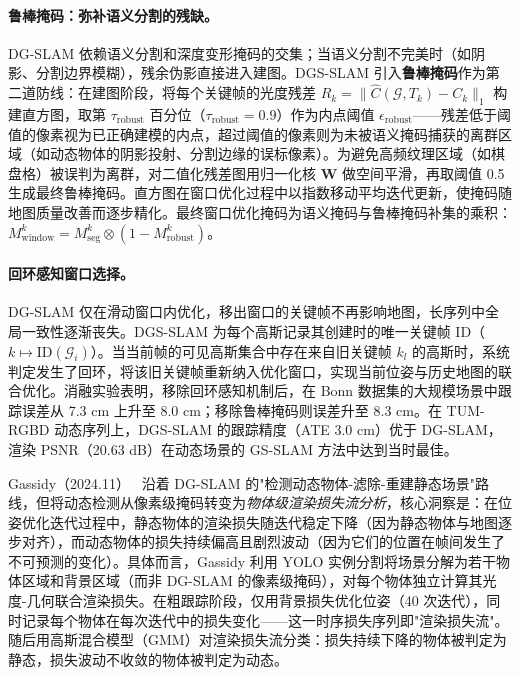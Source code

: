 \paragraph{鲁棒掩码：弥补语义分割的残缺。}DG-SLAM 依赖语义分割和深度变形掩码的交集；当语义分割不完美时（如阴影、分割边界模糊），残余伪影直接进入建图。DGS-SLAM 引入\textbf{鲁棒掩码}作为第二道防线：在建图阶段，将每个关键帧的光度残差 $R_k = \|\hat{C}(\mathcal{G}, T_k) - C_k\|_1$ 构建直方图，取第 $\tau_{\mathrm{robust}}$ 百分位（$\tau_{\mathrm{robust}} = 0.9$）作为内点阈值 $\epsilon_{\mathrm{robust}}$——残差低于阈值的像素视为已正确建模的内点，超过阈值的像素则为未被语义掩码捕获的离群区域（如动态物体的阴影投射、分割边缘的误标像素）。为避免高频纹理区域（如棋盘格）被误判为离群，对二值化残差图用归一化核 $\mathbf{W}$ 做空间平滑，再取阈值 0.5 生成最终鲁棒掩码。直方图在窗口优化过程中以指数移动平均迭代更新，使掩码随地图质量改善而逐步精化。最终窗口优化掩码为语义掩码与鲁棒掩码补集的乘积：$M_{\mathrm{window}}^k = M_{\mathrm{seg}}^k \otimes (1 - M_{\mathrm{robust}}^k)$。

\paragraph{回环感知窗口选择。}DG-SLAM 仅在滑动窗口内优化，移出窗口的关键帧不再影响地图，长序列中全局一致性逐渐丧失。DGS-SLAM 为每个高斯记录其创建时的唯一关键帧 ID（$k \mapsto \mathrm{ID}(\mathcal{G}_i)$）。当当前帧的可见高斯集合中存在来自旧关键帧 $k_l$ 的高斯时，系统判定发生了回环，将该旧关键帧重新纳入优化窗口，实现当前位姿与历史地图的联合优化。消融实验表明，移除回环感知机制后，在 Bonn 数据集的大规模场景中跟踪误差从 7.3 cm 上升至 8.0 cm；移除鲁棒掩码则误差升至 8.3 cm。在 TUM-RGBD 动态序列上，DGS-SLAM 的跟踪精度（ATE 3.0 cm）优于 DG-SLAM，渲染 PSNR（20.63 dB）在动态场景的 GS-SLAM 方法中达到当时最佳。

Gassidy（2024.11）~\cite{2411_15476} 沿着 DG-SLAM 的"检测动态物体-滤除-重建静态场景"路线，但将动态检测从像素级掩码转变为\emph{物体级渲染损失流分析}，核心洞察是：在位姿优化迭代过程中，静态物体的渲染损失随迭代稳定下降（因为静态物体与地图逐步对齐），而动态物体的损失持续偏高且剧烈波动（因为它们的位置在帧间发生了不可预测的变化）。具体而言，Gassidy 利用 YOLO 实例分割将场景分解为若干物体区域和背景区域（而非 DG-SLAM 的像素级掩码），对每个物体独立计算其光度-几何联合渲染损失。在粗跟踪阶段，仅用背景损失优化位姿（40 次迭代），同时记录每个物体在每次迭代中的损失变化——这一时序损失序列即"渲染损失流"。随后用高斯混合模型（GMM）对渲染损失流分类：损失持续下降的物体被判定为静态，损失波动不收敛的物体被判定为动态。

